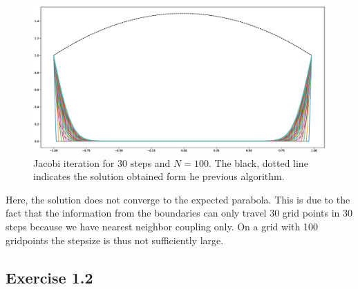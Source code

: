 \documentclass{scrartcl}
\begin{document}
\begin{figure}[H]
	\centering
	\includegraphics[width=1.1\linewidth]{Plots/Jacobi100.eps}
	\caption{Jacobi iteration for \(30\) steps and \( N=100 \). The black, dotted line indicates the solution obtained form he previous algorithm.}
	\label{fig:Jacobi100}
\end{figure}
Here, the solution does not converge to the expected parabola. This is due to the fact that the information from the boundaries can only travel 30 grid points in 30 steps because we have nearest neighbor coupling only. On a grid with 100 gridpoints the stepsize is thus not sufficiently large.

\subsection*{Exercise 1.2}
\end{document}

